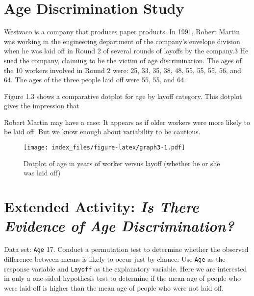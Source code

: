 \documentclass[
]{report}
\theoremstyle{definition}
\theoremstyle{definition}
\theoremstyle{definition}
\theoremstyle{definition}
\theoremstyle{remark}
\begin{document}
\hypertarget{age-discrimination-study}{%
\section*{Age Discrimination Study}\label{age-discrimination-study}}

\normalsize

Westvaco is a company that produces paper products. In 1991, Robert Martin was working in the engineering
department of the company's envelope division when he was laid off in Round 2 of several rounds of layoffs
by the company.3 He sued the company, claiming to be the victim of age discrimination. The ages of the 10
workers involved in Round 2 were: 25, 33, 35, 38, 48, 55, 55, 55, 56, and 64. The ages of the three people
laid off were 55, 55, and 64.

Figure 1.3 shows a comparative dotplot for age by layoff category. This dotplot gives the impression that

Robert Martin may have a case: It appears as if older workers were more likely to be laid off. But we know
enough about variability to be cautious.

\begin{figure}
\centering
\texttt{[image: index\_files/figure-latex/graph3-1.pdf]}
\caption{\label{fig:graph3}Dotplot of age in years of worker versus layoff (whether he or she was laid off)}
\end{figure}

\hypertarget{extended-activity-is-there-evidence-of-age-discrimination}{%
\section*{\texorpdfstring{Extended Activity: \emph{Is There Evidence of Age Discrimination?}}{Extended Activity: Is There Evidence of Age Discrimination?}}\label{extended-activity-is-there-evidence-of-age-discrimination}}

Data set: \texttt{Age}
17. Conduct a permutation test to determine whether the observed difference between means is likely to
occur just by chance. Use \texttt{Age} as the response variable and \texttt{Layoff} as the explanatory variable. Here
we are interested in only a one-sided hypothesis test to determine if the mean age of people who were
laid off is higher than the mean age of people who were not laid off.
\end{document}
